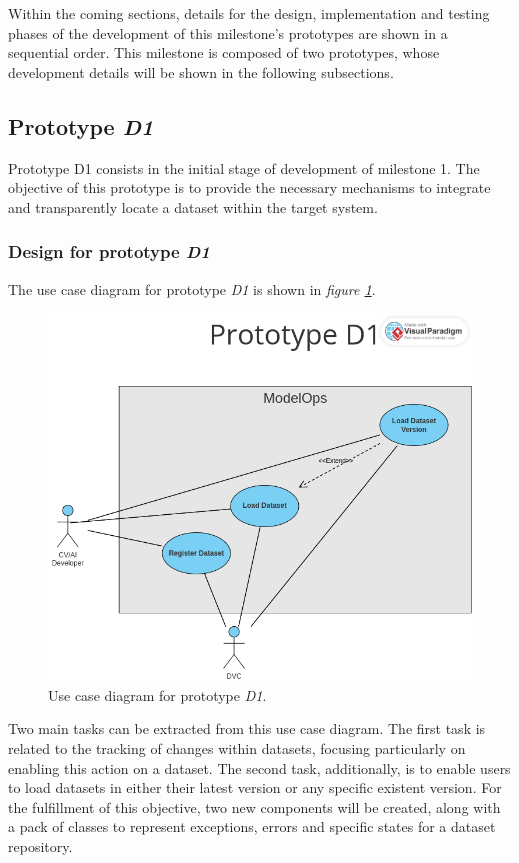 Within the coming sections, details for the design, implementation and testing phases of the development of this milestone's prototypes are shown in a sequential order. This
milestone is composed of two prototypes, whose development details will be shown in the following subsections.

\subsection{Prototype \emph{D1}}

Prototype D1 consists in the initial stage of development of milestone 1. The objective of this prototype is to 
provide the necessary mechanisms to integrate and transparently locate a dataset within the target system.

\subsubsection{Design for prototype \emph{D1}}

The use case diagram for prototype \emph{D1} is shown in \emph{figure \ref{fig:useCaseD1}}.

\begin{figure}[H]
    \centering
    \includegraphics[width=0.7\linewidth]{figs/use-case-D1.png}
    \caption{Use case diagram for prototype \emph{D1}.}
    \label{fig:useCaseD1}
\end{figure}

Two main tasks can be extracted from this use case diagram. The first task is related to the tracking of changes within datasets, focusing particularly on enabling this action on a 
dataset. The second task, additionally, is to enable users to load datasets in either their latest version or any specific existent version. For the fulfillment of 
this objective, two new components will be created, along with a pack of classes to represent exceptions, errors and specific states for a dataset repository.

